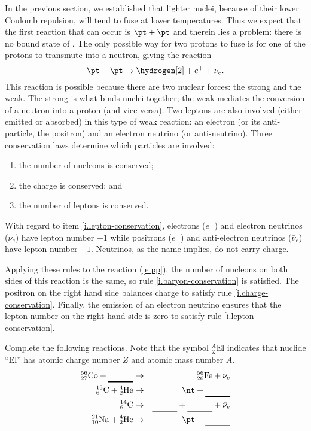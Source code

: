 In the previous section, we established that lighter nuclei, because of their lower Coulomb repulsion, will tend to fuse at lower temperatures. Thus we expect that the first reaction that can occur is $\pt+\pt$ and therein lies a problem: there is no bound state of \helium[2]. The only possible way for two protons to fuse is for one of the protons to transmute into a neutron, giving the reaction
\begin{equation}\label{e.pp}
	\pt + \pt \to \hydrogen[2] + e^{+} + \nu_{e}.
\end{equation}
This reaction is possible because there are two nuclear forces: the strong and the weak. The strong is what binds nuclei together; the weak mediates the conversion of a neutron into a proton (and vice versa). Two leptons are also involved (either emitted or absorbed) in this type of weak reaction: an electron (or its anti-particle, the positron) and an electron neutrino (or anti-neutrino). Three conservation laws determine which particles are involved:
\begin{enumerate}
\item\label{i.baryon-conservation} the number of nucleons is conserved;
\item\label{i.charge-conservation} the charge is conserved; and
\item\label{i.lepton-conservation} the number of leptons is conserved.
\end{enumerate}
With regard to item \ref{i.lepton-conservation}, electrons ($e^{-}$) and electron neutrinos ($\nu_{e}$) have lepton number $+1$ while positrons ($e^{+}$) and anti-electron neutrinos ($\bar{\nu}_{e}$) have lepton number $-1$. Neutrinos, as the name implies, do not carry charge.

Applying these rules to the reaction (\ref{e.pp}), the number of nucleons on both sides of this reaction is the same, so rule \ref{i.baryon-conservation} is satisfied. The positron on the right hand side balances charge to satisfy rule \ref{i.charge-conservation}. Finally, the emission of an electron neutrino ensures that the lepton number on the right-hand side is zero to satisfy rule \ref{i.lepton-conservation}.

\begin{exercisebox}
Complete the following reactions. Note that the symbol $_{Z}^{A}\mathrm{El}$ indicates that nuclide ``El'' has atomic charge number $Z$ and atomic mass number $A$.
\begin{eqnarray*}
\altnuc{27}{56}{Co} +  \nucarule &\to& \altnuc{26}{56}{Fe} + \nu_{e}\\
\altnuc{6}{13}{C} + \altnuc{2}{4}{He} &\to& \nt + \nucarule\\
\altnuc{6}{14}{C} &\to& \nucarule + \nucarule + \bar{\nu}_{e}\\
\altnuc{10}{21}{Na} + \altnuc{2}{4}{He} &\to& \pt + \nucarule\\
\end{eqnarray*}
\end{exercisebox}

